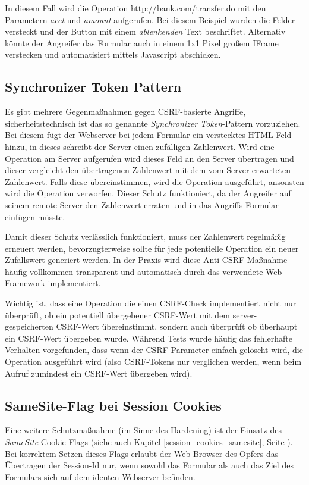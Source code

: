 In diesem Fall wird die Operation \url{http://bank.com/transfer.do} mit den Parametern \textit{acct} und \textit{amount} aufgerufen. Bei diesem Beispiel wurden die Felder versteckt und der Button mit einem \textit{ablenkenden} Text beschriftet. Alternativ könnte der Angreifer das Formular auch in einem 1x1 Pixel großem IFrame verstecken und automatisiert mittels Javascript abschicken.

\subsection{Synchronizer Token Pattern}

Es gibt mehrere Gegenmaßnahmen gegen CSRF-basierte Angriffe, sicherheitstechnisch ist das so genannte \textit{Synchronizer Token}-Pattern vorzuziehen. Bei diesem fügt der Webserver bei jedem Formular ein verstecktes HTML-Feld hinzu, in dieses schreibt der Server einen zufälligen Zahlenwert. Wird eine Operation am Server aufgerufen wird dieses Feld an den Server übertragen und dieser vergleicht den übertragenen Zahlenwert mit dem vom Server erwarteten Zahlenwert. Falls diese übereinstimmen, wird die Operation ausgeführt, ansonsten wird die Operation verworfen. Dieser Schutz funktioniert, da der Angreifer auf seinem remote Server den Zahlenwert erraten und in das Angriffs-Formular einfügen müsste.

Damit dieser Schutz verlässlich funktioniert, muss der Zahlenwert regelmäßig erneuert werden, bevorzugterweise sollte für jede potentielle Operation ein neuer Zufallswert generiert werden. In der Praxis wird diese Anti-CSRF Maßnahme häufig vollkommen transparent und automatisch durch das verwendete Web-Framework implementiert.

Wichtig ist, dass eine Operation die einen CSRF-Check implementiert nicht nur überprüft, ob ein potentiell übergebener CSRF-Wert mit dem server-gespeicherten CSRF-Wert übereinstimmt, sondern auch überprüft ob überhaupt ein CSRF-Wert übergeben wurde. Während Tests wurde häufig das fehlerhafte Verhalten vorgefunden, dass wenn der CSRF-Parameter einfach gelöscht wird, die Operation ausgeführt wird (also CSRF-Tokens nur verglichen werden, wenn beim Aufruf zumindest ein CSRF-Wert übergeben wird).

\subsection{SameSite-Flag bei Session Cookies}

Eine weitere Schutzmaßnahme (im Sinne des Hardening) ist der Einsatz des \textit{SameSite} Cookie-Flags (siehe auch Kapitel \ref{session_cookies_samesite}, Seite \pageref{session_cookies_samesite}). Bei korrektem Setzen dieses Flags erlaubt der Web-Browser des Opfers das Übertragen der Session-Id nur, wenn sowohl das Formular als auch das Ziel des Formulars sich auf dem identen Webserver befinden.

